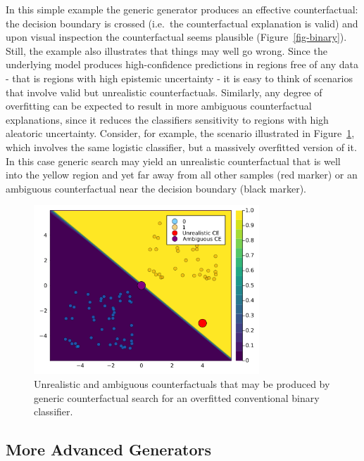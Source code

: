 \documentclass{juliacon}
\begin{document}
In this simple example the generic generator produces an effective
counterfactual: the decision boundary is crossed (i.e.~the
counterfactual explanation is valid) and upon visual inspection the
counterfactual seems plausible (Figure~\ref{fig-binary}). Still, the
example also illustrates that things may well go wrong. Since the
underlying model produces high-confidence predictions in regions free of
any data - that is regions with high epistemic uncertainty - it is easy
to think of scenarios that involve valid but unrealistic
counterfactuals. Similarly, any degree of overfitting can be expected to
result in more ambiguous counterfactual explanations, since it reduces
the classifiers sensitivity to regions with high aleatoric uncertainty.
Consider, for example, the scenario illustrated in
Figure~\ref{fig-binary-wrong}, which involves the same logistic
classifier, but a massively overfitted version of it. In this case
generic search may yield an unrealistic counterfactual that is well into
the yellow region and yet far away from all other samples (red marker)
or an ambiguous counterfactual near the decision boundary (black
marker).

\begin{figure}

{\centering \includegraphics[width=3.33333in,height=2.5in]{www/binary_wrong.png}

}

\caption{\label{fig-binary-wrong}Unrealistic and ambiguous
counterfactuals that may be produced by generic counterfactual search
for an overfitted conventional binary classifier.}

\end{figure}

\hypertarget{more-advanced-generators}{%
\subsection{More Advanced Generators}\label{more-advanced-generators}}
\end{document}
